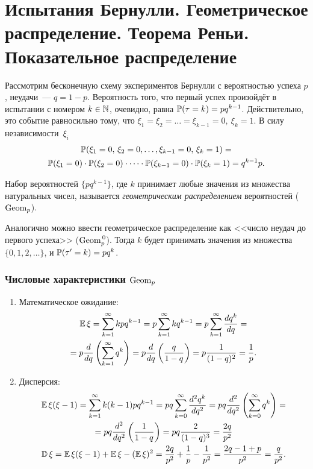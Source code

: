 \section{Испытания Бернулли. Геометрическое распределение. Теорема Реньи. Показательное распределение}
Рассмотрим бесконечную схему экспериментов Бернулли с вероятностью успеха $p$, неудачи~--- $q = 1 - p$. 
Вероятность того, что первый успех произойдёт в испытании с номером $k \in \mathbb{N}$, очевидно, равна $\operatorname{\mathbb{P}}(\tau = k) = pq^{k-1}$.
Действительно, это событие равносильно тому, что $\xi_1 = \xi_2 = \ldots = \xi_{k-1} = 0,\: \xi_k = 1$. 
В силу независимости~$\xi_i$
\begin{multline*}
    \operatorname{\mathbb{P}}(\xi_1 = 0,\, \xi_2 = 0, \ldots, \xi_{k-1} = 0,\, \xi_k = 1) = \\
    \operatorname{\mathbb{P}}(\xi_1 = 0) \cdot \operatorname{\mathbb{P}}(\xi_2 = 0) \cdot \cdots \cdot \operatorname{\mathbb{P}}(\xi_{k-1} = 0) \cdot \operatorname{\mathbb{P}}(\xi_k = 1) =
    q^{k-1}p.
\end{multline*}

\begin{defn}
    Набор вероятностей $\{p q^{k-1}\}$, где $k$ принимает любые значения из множества натуральных чисел, называется \textit{геометрическим распределением} вероятностей ($\operatorname{\mathrm{Geom}}_{p}$).
\end{defn}

Аналогично можно ввести геометрическое распределение как <<число неудач до первого успеха>> ($\operatorname{\mathrm{Geom}}^{\,0}_{p}$).
Тогда $k$ будет принимать значения из множества $\{0, 1, 2, \ldots\}$, и $\operatorname{\mathbb{P}}(\tau^{\prime} = k) = pq^k$.

\subsubsection{Числовые характеристики $\operatorname{\mathrm{Geom}}_{p}$}
\begin{enumerate}
    \item Математическое ожидание:
    \begin{multline*}
        \operatorname{\mathbb{E}} \xi=\sum\limits_{k=1}^{\infty} k p q^{k-1}=p \sum\limits_{k=1}^{\infty} k q^{k-1}=p \sum\limits_{k=1}^{\infty} \frac{d q^{k}}{d q} = \\
        = p \frac{d}{d q}\left(\sum\limits_{k=1}^{\infty} q^{k}\right)=p \frac{d}{d q}\left(\frac{q}{1-q}\right)=p \frac{1}{(1-q)^{2}}=\frac{1}{p}.
    \end{multline*}
    \item Дисперсия:
    \begin{multline*}
        \operatorname{\mathbb{E}} \xi(\xi-1)=\sum\limits_{k=1}^{\infty} k(k-1) p q^{k-1}=p q \sum\limits_{k=0}^{\infty} \frac{d^{2} q^{k}}{d q^{2}} =p q \frac{d^{2}}{d q^{2}}\left(\sum\limits_{k=0}^{\infty} q^{k}\right) = \\
        =p q \frac{d^{2}}{d q^{2}}\left(\frac{1}{1-q}\right)=p q \frac{2}{(1-q)^{3}}=\frac{2 q}{p^{2}} \\
        \operatorname{\mathbb{D}} \xi=\operatorname{\mathbb{E}} \xi(\xi-1)+\operatorname{\mathbb{E}} \xi-(\operatorname{\mathbb{E}} \xi)^{2}=\frac{2 q}{p^{2}}+\frac{1}{p}-\frac{1}{p^{2}}=\frac{2 q-1+p}{p^{2}}=\frac{q}{p^{2}}.
    \end{multline*}
\end{enumerate}


